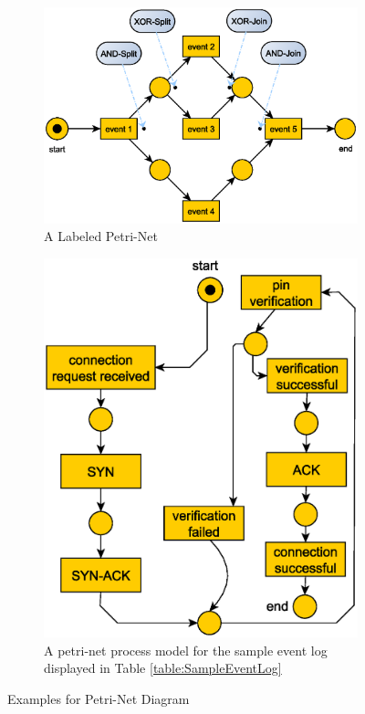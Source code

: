 \begin{figure}
	\begin{subfigure}{.5\textwidth}
		\centering
		\includegraphics[width=.8\linewidth]{images/labeled-petriNet.eps}
		\caption{A Labeled Petri-Net}
		\label{fig:LabeledPetriNet}
	\end{subfigure}%
	\begin{subfigure}{.5\textwidth}
		\centering
		\includegraphics[width=.8\linewidth]{images/labeled-petriNetOther_update.eps}
		\caption{A petri-net process model for the sample event log displayed in Table \ref{table:SampleEventLog}}
		\label{fig:LabeledPetriNetOther}
	\end{subfigure}
	\caption{Examples for Petri-Net Diagram}
	\label{fig:PetriNet}
\end{figure}

